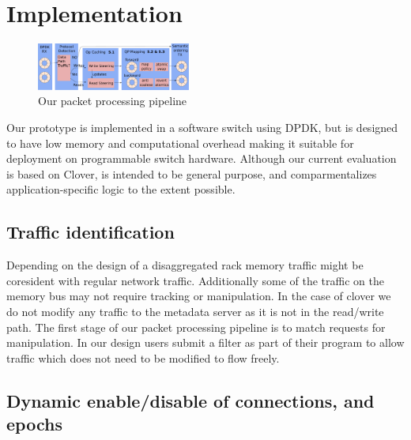 \section{Implementation}

\begin{figure}
    \includegraphics[width=0.45\textwidth]{fig/packet_processing.pdf}
    \caption{Our packet processing pipeline}
    \label{fig:system}
\end{figure}

Our {\sword} prototype is implemented in a software switch using DPDK,
but is designed to have low memory and computational overhead making
it suitable for deployment on programmable switch hardware.  Although
our current evaluation is based on Clover, {\sword} is intended to be
general purpose, and comparmentalizes application-specific logic to
the extent possible.



\subsection{Traffic identification} Depending on the design of a disaggregated
rack memory traffic might be coresident with regular network traffic.
Additionally some of the traffic on the memory bus may not require tracking or
manipulation. In the case of clover we do not modify any traffic to the metadata
server as it is not in the read/write path. The first stage of our packet
processing pipeline is to match requests for manipulation. In our design users
submit a filter as part of their program to allow traffic which does not need to
be modified to flow freely.

\subsection{Dynamic enable/disable of connections, and epochs}

